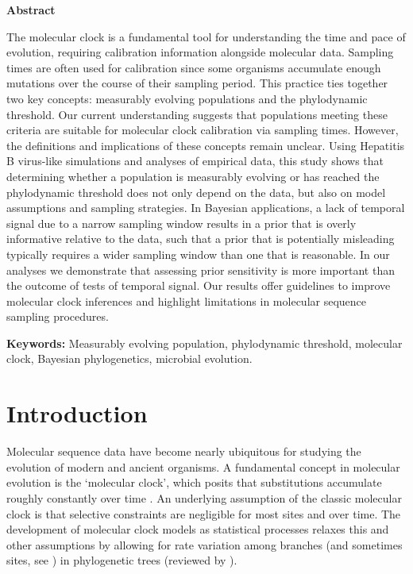 \documentclass[11pt]{article}
\begin{document}
\begin{Large}
	\textbf{Abstract}
\end{Large}
The molecular clock is a fundamental tool for understanding the time and pace of evolution, requiring calibration information alongside molecular data. Sampling times are often used for calibration since some organisms accumulate enough mutations over the course of their sampling period. This practice ties together two key concepts: measurably evolving populations and the phylodynamic threshold. Our current understanding suggests that populations meeting these criteria are suitable for molecular clock calibration via sampling times. However, the definitions and implications of these concepts remain unclear. Using Hepatitis B virus-like simulations and analyses of empirical data, this study shows that determining whether a population is measurably evolving or has reached the phylodynamic threshold does not only depend on the data, but also on model assumptions and sampling strategies. In Bayesian applications, a lack of temporal signal due to a narrow sampling window results in a prior that is overly informative relative to the data, such that a prior that is potentially misleading typically requires a wider sampling window than one that is reasonable. In our analyses we demonstrate that assessing prior sensitivity is more important than the outcome of tests of temporal signal. Our results offer guidelines to improve molecular clock inferences and highlight limitations in molecular sequence sampling procedures.

\textbf{Keywords:} Measurably evolving population, phylodynamic threshold, molecular clock, Bayesian phylogenetics, microbial evolution.

\section{Introduction}
Molecular sequence data have become nearly ubiquitous for studying the evolution of modern and ancient organisms. A fundamental concept in molecular evolution is the `molecular clock', which posits that substitutions accumulate roughly constantly over time \citep{zuckerkandl1965evolutionary}. An underlying assumption of the classic molecular clock is that selective constraints are negligible for most sites and over time. The development of molecular clock models as statistical processes relaxes this and other assumptions by allowing for rate variation among branches (and sometimes sites, see \citealt{ho2014changing}) in phylogenetic trees (reviewed by \cite{ho2014molecular, guindon2020rates}).
\end{document}
